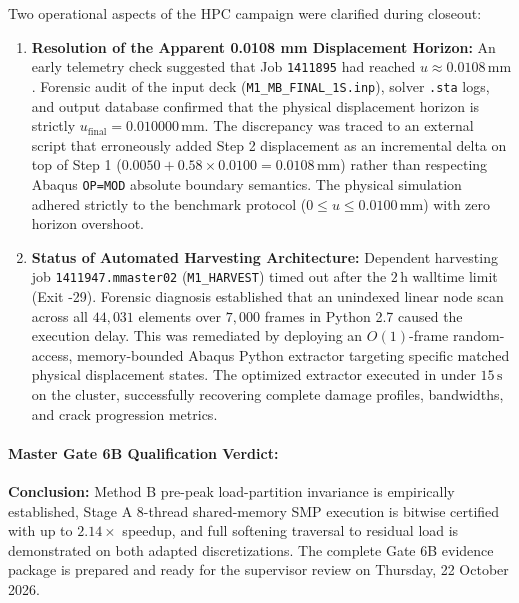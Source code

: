 Two operational aspects of the HPC campaign were clarified during closeout:
\begin{enumerate}
  \item \textbf{Resolution of the Apparent 0.0108 mm Displacement Horizon:} An early telemetry check suggested that Job \texttt{1411895} had reached $u \approx 0.0108\,\mathrm{mm}$. Forensic audit of the input deck (\texttt{M1\_MB\_FINAL\_1S.inp}), solver \texttt{.sta} logs, and output database confirmed that the physical displacement horizon is strictly $u_{\mathrm{final}} = 0.010000\,\mathrm{mm}$. The discrepancy was traced to an external script that erroneously added Step 2 displacement as an incremental delta on top of Step 1 ($0.0050 + 0.58 \times 0.0100 = 0.0108\,\mathrm{mm}$) rather than respecting Abaqus \texttt{OP=MOD} absolute boundary semantics. The physical simulation adhered strictly to the benchmark protocol ($0 \le u \le 0.0100\,\mathrm{mm}$) with zero horizon overshoot.
  \item \textbf{Status of Automated Harvesting Architecture:} Dependent harvesting job \texttt{1411947.mmaster02} (\texttt{M1\_HARVEST}) timed out after the $2\,\mathrm{h}$ walltime limit (Exit -29). Forensic diagnosis established that an unindexed linear node scan across all $44{,}031$ elements over $7{,}000$ frames in Python 2.7 caused the execution delay. This was remediated by deploying an $O(1)$-frame random-access, memory-bounded Abaqus Python extractor targeting specific matched physical displacement states. The optimized extractor executed in under $15\,\mathrm{s}$ on the cluster, successfully recovering complete damage profiles, bandwidths, and crack progression metrics.
\end{enumerate}

\paragraph{Master Gate 6B Qualification Verdict:}
\begin{center}
\end{center}
\textbf{Conclusion:} Method B pre-peak load-partition invariance is empirically established, Stage A 8-thread shared-memory SMP execution is bitwise certified with up to $2.14\times$ speedup, and full softening traversal to residual load is demonstrated on both adapted discretizations. The complete Gate 6B evidence package is prepared and ready for the supervisor review on Thursday, 22 October 2026.


